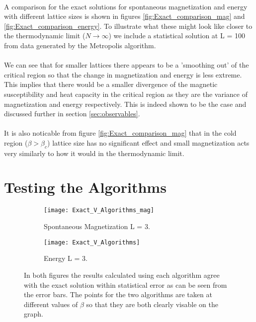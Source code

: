 \documentclass[12pt] {report} %
\begin{document}
				
			\paragraph{}
				A comparison for the exact solutions for spontaneous magnetization and energy with different lattice sizes is shown in figures \ref{fig:Exact_comparison_mag} and \ref{fig:Exact_comparison_energy}. To illustrate what these might look like closer to the thermodynamic limit ($N \rightarrow \infty$) we include a statistical solution at L = 100 from data generated by the Metropolis algorithm.
			
			\paragraph{}
				We can see that for smaller lattices there appears to be a 'smoothing out' of the critical region so that the change in magnetization and energy is less extreme. This implies that there would be a smaller divergence of the magnetic susceptibility and heat capacity in the critical region as they are the variance of magnetization and energy respectively. This is indeed shown to be the case and discussed further in section \ref{sec:observables}. 
				
		\paragraph{}
			It is also noticable from figure \ref{fig:Exact_comparison_mag} that in the cold region ($\beta > \beta_c$) lattice size has no significant effect and small magnetization acts very similarly to how it would in the thermodynamic limit.
			
						
		\section{Testing the Algorithms}  

				\begin{figure}[h]
					\centering
					\begin{subfigure}[h]{0.49\textwidth}
					\centering
						\texttt{[image: Exact\_V\_Algorithms\_mag]}
						\caption{Spontaneous Magnetization L = 3.}
						\label{fig:Exact V Algorithms_mag}
					\end{subfigure}
					\hfill
					\begin{subfigure}[h]{0.49\textwidth}
						\centering
							\texttt{[image: Exact\_V\_Algorithms]}
							\caption{Energy L = 3.}
							\label{fig:Exact V Algorithms_energy}
					\end{subfigure} 
					\caption{In both figures the results calculated using each algorithm agree with the exact solution within  statistical error as can be seen from the error bars. The points for the two algorithms are taken at different values of $\beta$ so that they are both clearly visable on the graph.}
					\label{fig:exact_V_statistical}
				\end{figure}
				
\end{document}
